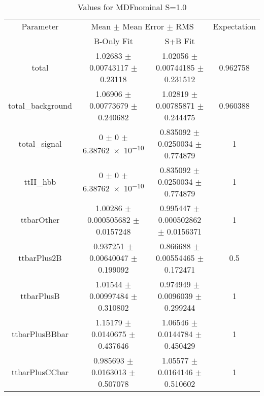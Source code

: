 \begin{table}
\centering
\caption{Values for MDFnominal S=1.0}
\begin{tabular}{cccc}
\toprule
Parameter & \multicolumn{2}{c}{Mean $\pm$ Mean Error $\pm$ RMS} & Expectation\\
 & B-Only Fit & S+B Fit & \\
\midrule
total & \num{1.02683} $\pm$ \num{0.00743117} $\pm$ \num{0.23118} & \num{1.02056} $\pm$ \num{0.00744185} $\pm$ \num{0.231512} & \num{0.962758}\\
total\_background & \num{1.06906} $\pm$ \num{0.00773679} $\pm$ \num{0.240682} & \num{1.02819} $\pm$ \num{0.00785871} $\pm$ \num{0.244475} & \num{0.960388}\\
total\_signal & \num{0} $\pm$ \num{0} $\pm$ \num{6.38762e-10} & \num{0.835092} $\pm$ \num{0.0250034} $\pm$ \num{0.774879} & \num{1}\\
ttH\_hbb & \num{0} $\pm$ \num{0} $\pm$ \num{6.38762e-10} & \num{0.835092} $\pm$ \num{0.0250034} $\pm$ \num{0.774879} & \num{1}\\
ttbarOther & \num{1.00286} $\pm$ \num{0.000505682} $\pm$ \num{0.0157248} & \num{0.995447} $\pm$ \num{0.000502862} $\pm$ \num{0.0156371} & \num{1}\\
ttbarPlus2B & \num{0.937251} $\pm$ \num{0.00640047} $\pm$ \num{0.199092} & \num{0.866688} $\pm$ \num{0.00554465} $\pm$ \num{0.172471} & \num{0.5}\\
ttbarPlusB & \num{1.01544} $\pm$ \num{0.00997484} $\pm$ \num{0.310802} & \num{0.974949} $\pm$ \num{0.0096039} $\pm$ \num{0.299244} & \num{1}\\
ttbarPlusBBbar & \num{1.15179} $\pm$ \num{0.0140675} $\pm$ \num{0.437646} & \num{1.06546} $\pm$ \num{0.0144784} $\pm$ \num{0.450429} & \num{1}\\
ttbarPlusCCbar & \num{0.985693} $\pm$ \num{0.0163013} $\pm$ \num{0.507078} & \num{1.05577} $\pm$ \num{0.0164146} $\pm$ \num{0.510602} & \num{1}\\
\bottomrule
\end{tabular}
\end{table}